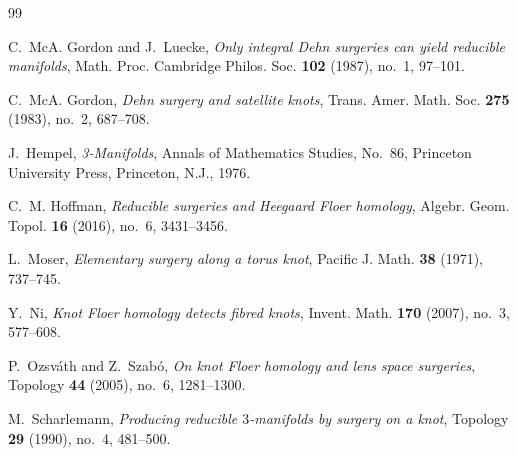 \documentclass[11pt]{article}
\begin{document}
\begin{thebibliography}{99}

C.~McA. Gordon and J.~Luecke,
\emph{Only integral Dehn surgeries can yield reducible manifolds},
Math. Proc. Cambridge Philos. Soc. \textbf{102} (1987), no.~1, 97--101.

C.~McA. Gordon,
\emph{Dehn surgery and satellite knots},
Trans. Amer. Math. Soc. \textbf{275} (1983), no.~2, 687--708.

J.~Hempel,
\emph{3-Manifolds},
Annals of Mathematics Studies, No.~86,
Princeton University Press, Princeton, N.J., 1976.

C.~M. Hoffman,
\emph{Reducible surgeries and Heegaard Floer homology},
Algebr. Geom. Topol. \textbf{16} (2016), no.~6, 3431--3456.

L.~Moser,
\emph{Elementary surgery along a torus knot},
Pacific J. Math. \textbf{38} (1971), 737--745.

Y.~Ni,
\emph{Knot Floer homology detects fibred knots},
Invent. Math. \textbf{170} (2007), no.~3, 577--608.

P.~Ozsv\'ath and Z.~Szab\'o,
\emph{On knot Floer homology and lens space surgeries},
Topology \textbf{44} (2005), no.~6, 1281--1300.

M.~Scharlemann,
\emph{Producing reducible $3$-manifolds by surgery on a knot},
Topology \textbf{29} (1990), no.~4, 481--500.

\end{thebibliography}
\end{document}
